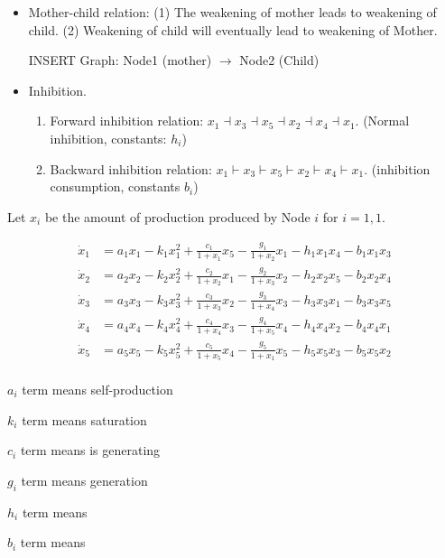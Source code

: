 \documentclass{article}
\begin{document}
\begin{itemize}
\item Mother-child relation: (1) The weakening of mother leads to weakening of child. (2) Weakening of child will eventually lead to weakening of Mother.

INSERT Graph: Node1 (mother) $\to$ Node2 (Child) 
\item Inhibition.

\begin{enumerate}
\item Forward inhibition relation:  $x_1 \dashv x_3 \dashv x_5 \dashv x_2 \dashv x_4\dashv x_1$. (Normal inhibition, constants: $h_i$)
\item Backward inhibition relation: $x_1 \vdash x_3 \vdash x_5 \vdash x_2 \vdash x_4\vdash x_1$. (inhibition consumption, constants $b_i$)
\end{enumerate}


\end{itemize}
Let $x_i$ be the amount of production produced by Node $i$ for $i = 1, 1$.


\begin{equation}
\begin{array}{ll}
\dot{x}_1 &=  a_1 x_1 -  k_1 x_1^2 + \frac{c_1}{1+x_1}x_5- \frac{g_1 }{1+x_2}x_1- h_1 x_1 x_4  - b_1 x_1x_3\\
\dot{x}_2 & = a_2 x_2 -  k_2 x_2^2 + \frac{c_2}{1+x_2}x_1 - \frac{g_2}{1+x_3}x_2 - h_2 x_2 x_5- b_2 x_2x_4\\
\dot{x}_3 & = a_3 x_3 -  k_3 x_3^2 + \frac{c_3}{1+x_3}x_2 - \frac{g_3}{1+x_4}x_3 - h_3 x_3 x_1- b_3 x_3 x_5\\
\dot{x}_4 & = a_4 x_4 -  k_4 x_4^2 + \frac{c_4}{1+x_4}x_3 - \frac{g_4}{1+x_5}x_4 - h_4 x_4 x_2 - b_4 x_4x_1\\
\dot{x}_5 & = a_5 x_5 -  k_5 x_5^2 + \frac{c_5}{1+x_5}x_4 - \frac{g_5}{1+x_1}x_5 - h_5 x_5 x_3- b_5 x_5x_2\\
\end{array}
\end{equation}

$a_i$ term means self-production

$k_i$ term means saturation

$c_i$ term means is generating

$g_i$ term means generation

$h_i$ term means

$b_i$ term means
\end{document}
